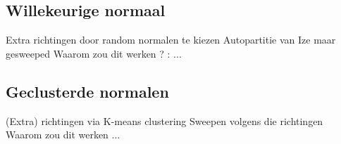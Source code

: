 \subsection{Willekeurige normaal}
    Extra richtingen door random normalen te kiezen
    Autopartitie van Ize maar gesweeped
    Waarom zou dit werken ? : ...
    
\subsection{Geclusterde normalen}
    (Extra) richtingen via K-means clustering
    Sweepen volgens die richtingen
    Waarom zou dit werken ...



